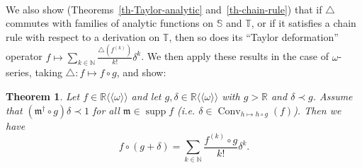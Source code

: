\documentclass{article}
\newcommand{\llangle}{{\langle\!\langle}}
\newcommand{\of}{:}
\newcommand{\rrangle}{{\rangle\!\rangle}}
\newcommand{\tmop}[1]{\ensuremath{\operatorname{#1}}}
\newtheorem{maintheorem}{Theorem}
\theoremstyle{remark}\newtheorem*{convention*}{Convention}
\begin{document}
\

We also show (Theorems~\ref{th-Taylor-analytic} and~\ref{th-chain-rule}) that
if $\triangle$ commutes with families of analytic functions on $\mathbb{S}$
and $\mathbb{T}$, or if it satisfies a chain rule with respect to a derivation
on $\mathbb{T}$, then so does its ``Taylor deformation'' operator $f \mapsto
\sum_{k \in \mathbb{N}} \frac{\triangle (f^{(k)})}{k!} \delta^k$. We then
apply these results in the case of $\omega$-series, taking $\triangle \of f
\mapsto f \circ g$, and show:

\begin{maintheorem}
  \label{th-main}Let $f \in \mathbb{R} \llangle \omega \rrangle$ and let $g,
  \delta \in \mathbb{R} \llangle \omega \rrangle$ with $g >\mathbb{R}$ and
  $\delta \prec g$. Assume that $(\mathfrak{m}^{\dag} \circ g) \delta \prec 1$
  for all $\mathfrak{m} \in \tmop{supp} f$ (i.e. $\delta \in \tmop{Conv}_{h
  \mapsto h \circ g} (f)$). Then we have
  \[ f \circ (g + \delta) = \sum_{k \in \mathbb{N}} \frac{f^{(k)} \circ g}{k!}
     \delta^k . \]
\end{maintheorem}
\end{document}
